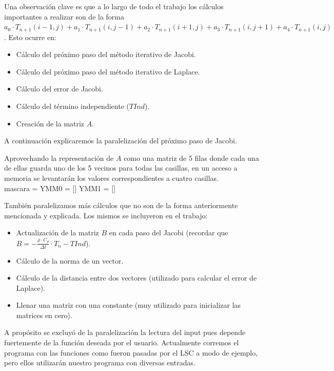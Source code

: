 \documentclass[a4paper]{article}
\begin{document}
Una observación clave es que a lo largo de todo el trabajo los cálculos importantes a realizar son de la
forma $a_0 \cdot T_{n+1}(i-1,j) + a_1 \cdot T_{n+1}(i,j-1) + a_2 \cdot T_{n+1}(i+1,j) + a_3 \cdot T_{n+1}(i,j+1) + a_4 \cdot T_{n+1}(i,j)$. Esto ocurre en:

\begin{itemize}
\item Cálculo del próximo paso del método iterativo de Jacobi.
\item Cálculo del próximo paso del método iterativo de Laplace.
\item Cálculo del error de Jacobi.
\item Cálculo del término independiente ($TInd$).
\item Creación de la matriz $A$.
\end{itemize}


A continuación explicaremos la paralelización del próximo paso de Jacobi. 

Aprovechando la representación de $A$ como una matriz de 5 filas donde cada una de ellas guarda uno de los 5 vecinos para todas las casillas, en un acceso a memoria se levantarán los valores correspondientes a cuatro casillas. \\

mascara = 
YMM0 = []
YMM1 = []

También paralelizamos más cálculos que no son de la forma anteriormente mencionada y explicada. Los mismos se incluyeron en el trabajo:

\begin{itemize}
\item Actualización de la matriz $B$ en cada paso del Jacobi (recordar que $B = -\frac{\rho \cdot C_\rho}{\Delta t} \cdot T_n - TInd$).
\item Cálculo de la norma de un vector.
\item Cálculo de la distancia entre dos vectores (utilizado para calcular el error de Laplace).
\item Llenar una matriz con una constante (muy utilizado para inicializar las matrices en cero).
\end{itemize}

A propósito se excluyó de la paralelización la lectura del input pues depende 
fuertemente de la función deseada por el usuario. Actualmente corremos el programa
con las funciones como fueron pasadas por el LSC a modo de ejemplo, pero ellos utilizarán
nuestro programa con diversas entradas. \\
\end{document}
